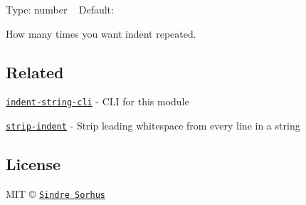 Type\+: {\ttfamily number} ~\newline
Default\+: {}

How many times you want {\ttfamily indent} repeated.

\subsection*{Related}


\begin{DoxyItemize}
\item \href{https://github.com/sindresorhus/indent-string-cli}{\tt indent-\/string-\/cli} -\/ C\+LI for this module
\item \href{https://github.com/sindresorhus/strip-indent}{\tt strip-\/indent} -\/ Strip leading whitespace from every line in a string
\end{DoxyItemize}

\subsection*{License}

M\+IT © \href{http://sindresorhus.com}{\tt Sindre Sorhus} 